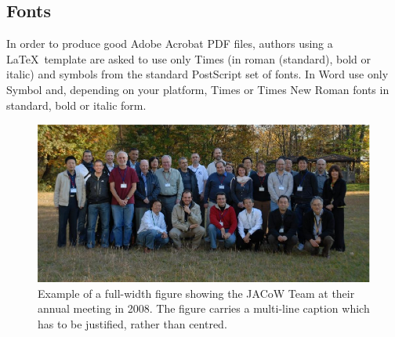 \documentclass{JAC2003}
\begin{document}

\subsection{Fonts}

In order to produce good Adobe Acrobat PDF files, 
authors using a \LaTeX\ template are asked to use only Times (in roman (standard), bold or
italic) and symbols from  the standard PostScript set of
fonts. In Word use only Symbol and, depending on your platform, Times or Times New Roman fonts in standard, bold or italic form. 

\begin{figure}[tb]
    \centering
    \includegraphics*[width=168mm]{JACpic2v2.eps}
    \caption{Example of a full-width figure showing the JACoW Team at their annual meeting in 2008. 
    The figure carries a multi-line caption which has to be justified, rather than centred.}
    \label{l2ea4-f2}
\end{figure}
\end{document}
